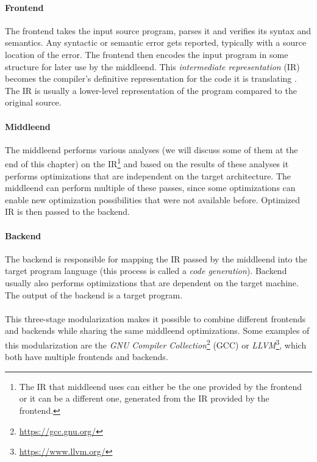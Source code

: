 \documentclass[thesis=M,english]{FITthesis}[2019/12/23]
\begin{document}
\paragraph*{Frontend} The frontend takes the input source program, parses it and verifies its syntax and semantics. Any syntactic or semantic error gets reported, typically with a source location of the error. The frontend then encodes the input program in some structure for later use by the middleend. This \emph{intermediate representation} (IR) becomes the compiler's definitive representation for the code it is translating \cite[Chap. 1.2]{eng_comp}. The IR is usually a lower-level representation of the program compared to the original source.

\paragraph*{Middleend} The middleend performs various analyses (we will discuss some of them at the end of this chapter) on the IR\footnote{The IR that middleend uses can either be the one provided by the frontend or it can be a different one, generated from the IR provided by the frontend.} and based on the results of these analyses it performs optimizations that are independent on the target architecture. The middleend can perform multiple of these passes, since some optimizations can enable new optimization possibilities that were not available before. Optimized IR is then passed to the backend.

\paragraph*{Backend} The backend is responsible for mapping the IR passed by the middleend into the target program language (this process is called a \emph{code generation}). Backend usually also performs optimizations that are dependent on the target machine. The output of the backend is a target program.

\paragraph*{} This three-stage modularization makes it possible to combine different frontends and backends while sharing the same middleend optimizations. Some examples of this modularization are the \emph{GNU Compiler Collection}\footnote{\url{https://gcc.gnu.org/}} (GCC) or \emph{LLVM}\footnote{\url{https://www.llvm.org/}}, which both have multiple frontends and backends.
\end{document}
